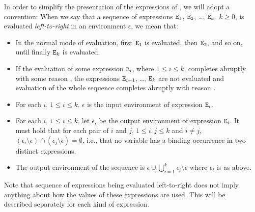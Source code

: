 In order to simplify the presentation of the expressions of \Erlang,
we will adopt a convention:
When we say that a sequence of expressions
${\tt{\sl E}}_1$, ${\tt{\sl E}}_2$, \ldots, ${\tt{\sl E}}_k$, $k\geq0$, is evaluated
\emph{left-to-right}
in an environment $\epsilon$, we mean that:
\begin{itemize}
\item In the normal mode of evaluation, first ${\tt{\sl E}}_1$ is evaluated, then
${\tt{\sl E}}_2$, and so on, until finally ${\tt{\sl E}}_k$ is evaluated.
\item If the evaluation of some expression ${\tt{\sl E}}_i$, where $1\leq i\leq k$, completes
abruptly with some reason , the expressions ${\tt{\sl E}}_{i+1}$, \ldots, ${\tt{\sl E}}_k$
are not evaluated and evaluation of the whole sequence completes abruptly with reason
.
\item For each $i$, $1\leq i\leq k$, $\epsilon$ is the input environment of
expression ${\tt{\sl E}}_i$.
\item For each $i$, $1\leq i\leq k$, let $\epsilon_i$ be the output environment
of expression ${\tt{\sl E}}_i$.  It must hold that for each pair of $i$ and $j$, $1\leq i,j\leq k$
and $i\neq j$, $(\epsilon_i\setminus\epsilon)\cap(\epsilon_j\setminus\epsilon) =
\emptyset$,  i.e., that no variable has a binding occurrence in two distinct
expressions.
\item The output environment of the sequence is
$\epsilon\cup\bigcup_{i=1}^k\epsilon_i\setminus\epsilon$ where $\epsilon_i$ is as above.
\end{itemize}
Note that sequence of expressions being evaluated left-to-right does
not imply anything about how the values of these expressions are used.
This will be described separately for each kind of expression.

